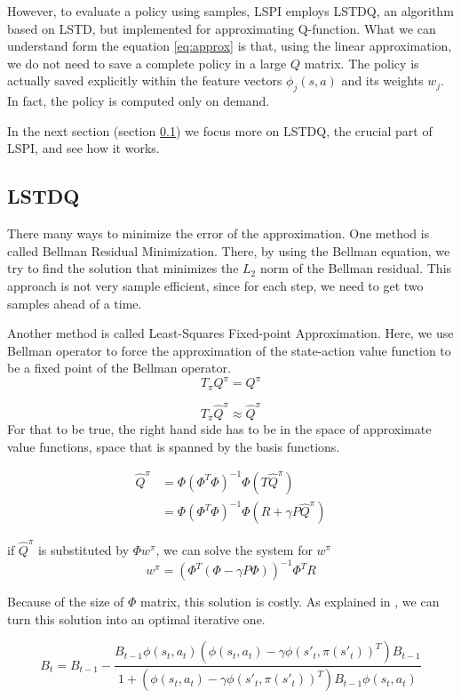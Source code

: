 \documentclass{article}
\theoremstyle{remark}
\begin{document}
However, to evaluate a policy using samples, LSPI employs LSTDQ, an algorithm based on LSTD, but implemented for approximating Q-function. What we can understand form the equation \ref{eq:approx} is that, using the linear approximation, we do not need to save a complete policy in a large $Q$ matrix. The policy is actually saved explicitly within the feature vectors $\phi_j(s,a)$ and its weights $w_j$. In fact, the policy is computed only on demand.

In the next section (section \ref{sec:LSTDQ}) we focus more on LSTDQ, the crucial part of LSPI, and see how it works.



\subsection{LSTDQ} \label{sec:LSTDQ}
There many ways to minimize the error of the approximation. One method is called Bellman Residual Minimization. There, by using the Bellman equation, we try to find the solution that minimizes the $L_2$ norm of the Bellman residual. This approach is not very sample efficient, since for each step, we need to get two samples ahead of a time.

Another method is called Least-Squares Fixed-point Approximation. Here, we use Bellman operator to force the approximation of the state-action value function to be a fixed point of the Bellman operator. 
\[ T_\pi Q^\pi = Q^\pi
\]

\[ T_\pi \hat{Q}^\pi\approx \hat{Q}^\pi
\]
For that to be true, the right hand side has to be in the space of approximate value functions, space that is spanned by the basis functions.

\[ 
\begin{split}
  \hat{Q}^\pi & = \Phi (\Phi^T \Phi)^{-1}\Phi (T\hat{Q}^\pi) \\
  &= \Phi (\Phi^T \Phi)^{-1}\Phi (R + \gamma P \hat{Q}^\pi)
\end{split}
\]


if $\hat{Q}^\pi$ is substituted by $\Phi w^\pi$, we can solve the system for $w^\pi$
\[ w^\pi = (\Phi^T(\Phi - \gamma P \Phi))^{-1} \Phi^T R
\]

Because of the size of $\Phi$ matrix, this solution is costly. As explained in \cite{Lagoudakis2004}, we can turn this solution into an optimal iterative one.

\[ B_t = B_{t-1} - \frac{B_{t-1} \phi(s_t, a_t)(\phi(s_t, a_t) - \gamma \phi(s'_t, \pi(s'_t))^{T}) B_{t-1}}{1+(\phi(s_t, a_t) - \gamma \phi(s'_t, \pi(s'_t))^{T})B_{t-1}\phi(s_t, a_t)}
\]
\end{document}
